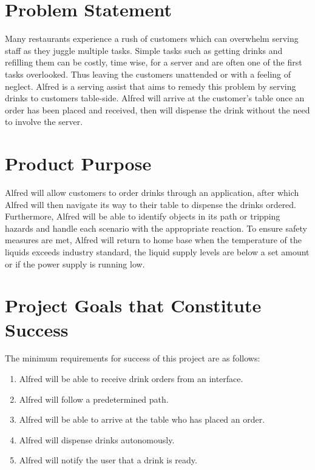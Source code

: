 \documentclass [10pt]{article}
\begin{document}
\pagebreak


\section{Problem Statement}

\indent\indent Many restaurants experience a rush of customers which can overwhelm serving staff as they juggle multiple tasks. Simple tasks such as getting drinks and refilling them can be costly, time wise, for a server and are often one of the first tasks overlooked. Thus leaving the customers unattended or with a feeling of neglect. Alfred is a serving assist that aims to remedy this problem by serving drinks to customers table-side. Alfred will arrive at the customer's table once an order has been placed and received, then will dispense the drink without the need to involve the server. 


\section{Product Purpose}

\indent\indent Alfred will allow customers to order drinks through an application, after which Alfred will then navigate its way to their table to dispense the drinks ordered. Furthermore, Alfred will be able to identify objects in its path or tripping hazards and handle each scenario with the appropriate reaction. To ensure safety measures are met, Alfred will return to home base when the temperature of the liquids exceeds industry standard, the liquid supply levels are below a set amount or if the power supply is running low.


\section{Project Goals that Constitute Success }
The minimum requirements for success of this project are as follows:\\

\begin{enumerate}[label=M\arabic*:, ref =\arabic*, leftmargin=0.5in]

	\item Alfred will be able to receive drink orders from an interface.
	\item Alfred will follow a predetermined path.
	\item Alfred will be able to arrive at the table who has placed an order.
	\item Alfred will dispense drinks autonomously.
	\item Alfred will notify the user that a drink is ready.
	
\end{enumerate}
\end{document}
